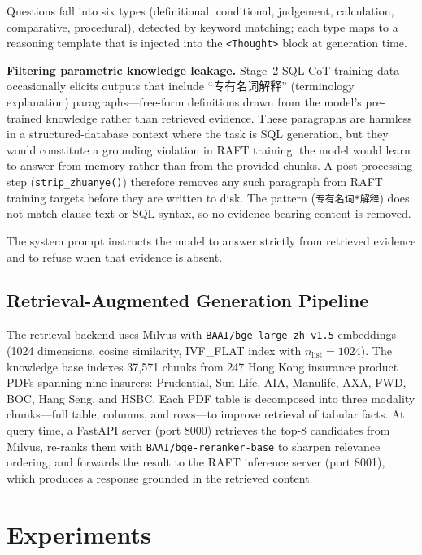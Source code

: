 Questions fall into six types (definitional, conditional, judgement,
calculation, comparative, procedural), detected by keyword matching;
each type maps to a reasoning template that is injected into the
\texttt{<Thought>} block at generation time.

\noindent\textbf{Filtering parametric knowledge leakage.}
Stage~2 SQL-CoT training data occasionally elicits outputs that include
``专有名词解释'' (terminology explanation) paragraphs---free-form definitions
drawn from the model's pre-trained knowledge rather than retrieved evidence.
These paragraphs are harmless in a structured-database context where the task
is SQL generation, but they would constitute a grounding violation in RAFT
training: the model would learn to answer from memory rather than from
the provided chunks.
A post-processing step (\texttt{strip\_zhuanye()}) therefore removes any such
paragraph from RAFT training targets before they are written to disk.
The pattern (\texttt{专有名词*解释}) does not match clause text or SQL syntax,
so no evidence-bearing content is removed.

The system prompt instructs the model to answer strictly from retrieved
evidence and to refuse when that evidence is absent.

\subsection{Retrieval-Augmented Generation Pipeline}

The retrieval backend uses Milvus with \texttt{BAAI/bge-large-zh-v1.5}
embeddings (1024 dimensions, cosine similarity, IVF\_FLAT index with
$n_\text{list}{=}1024$).
The knowledge base indexes 37,571 chunks from 247 Hong Kong insurance product
PDFs spanning nine insurers: Prudential, Sun Life, AIA, Manulife, AXA, FWD,
BOC, Hang Seng, and HSBC.
Each PDF table is decomposed into three modality chunks---full table, columns,
and rows---to improve retrieval of tabular facts.
At query time, a FastAPI server (port 8000) retrieves the top-8 candidates
from Milvus, re-ranks them with \texttt{BAAI/bge-reranker-base} to sharpen
relevance ordering, and forwards the result to the RAFT inference server
(port 8001), which produces a response grounded in the retrieved content.


\section{Experiments}
\label{sec:exp}

